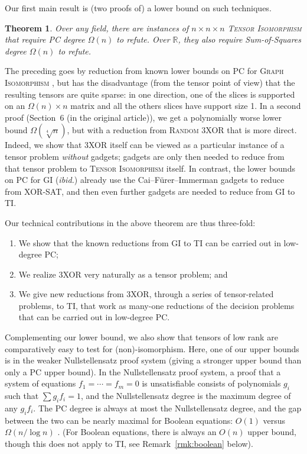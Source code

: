 \documentclass[10pt,a4paper]{article}
\newtheorem{theorem}{Theorem}[section]
\theoremstyle{definition}
\newcommand{\R}{\mathbb{R}}
\begin{document}
Our first main result is (two proofs of) a lower bound on such techniques.


\begin{theorem} \label{thm:lowerMain}
Over any field, there are instances of $n \times n \times n$ \textsc{Tensor Isomorphism} that require PC degree $\Omega(n)$ to refute. Over $\R$, they also require Sum-of-Squares degree $\Omega(n)$ to refute.
\end{theorem}


The preceding goes by reduction from known lower bounds on PC for \textsc{Graph Isomorphism} \cite{BerkholzG15, BerkholzG16}, but has the disadvantage (from the tensor point of view) that the resulting tensors are quite sparse: in one direction, one of the slices is supported on an $\Omega(n) \times n$ matrix and all the others slices have support size 1. In a second proof (Section~6 (in the original article)), we get a polynomially worse lower bound $\Omega(\sqrt[4]{n})$, but with a reduction from \textsc{Random 3XOR} that is more direct. Indeed, we show that 3XOR itself can be viewed as a particular instance of a tensor problem \emph{without} gadgets; gadgets are only then needed to reduce from that tensor problem to \textsc{Tensor Isomorphism} itself. In contrast, the lower bounds on PC for \textsc{GI} (\emph{ibid.}) already use the Cai--F\"{u}rer--Immerman gadgets \cite{CFI} to reduce from XOR-SAT, and then even further gadgets are needed to reduce from \textsc{GI} to \textsc{TI}. 

Our technical contributions in the above theorem are thus three-fold: 
\begin{enumerate}
\item We show that the known reductions from \textsc{GI} to \textsc{TI} can be carried out in low-degree PC; 
\item We realize 3XOR very naturally as a tensor problem; and 
\item We give new reductions from 3XOR, through a series of tensor-related problems, to \textsc{TI}, that work as many-one reductions of the decision problems that can be carried out in low-degree PC.
\end{enumerate}

Complementing our lower bound, we also show that tensors of low rank are comparatively easy to test for (non)-isomorphism. Here, one of our upper bounds is in the weaker Nullstellensatz proof system (giving a stronger upper bound than only a PC upper bound). In the Nullstellensatz proof system, a proof that a system of equations $f_1 = \dotsb = f_m = 0$ is unsatisfiable consists of polynomials $g_i$ such that $\sum g_i f_i = 1$, and the Nullstellensatz degree is the maximum degree of any $g_i f_i$. The PC degree is always at most the Nullstellensatz degree, and the gap between the two can be nearly maximal for Boolean equations: $O(1)$ versus $\Omega(n / \log n)$ \cite{BCIP}. (For Boolean equations, there is always an $O(n)$ upper bound, though this does not apply to \textsc{TI}, see Remark~\ref{rmk:boolean} below).
\end{document}
